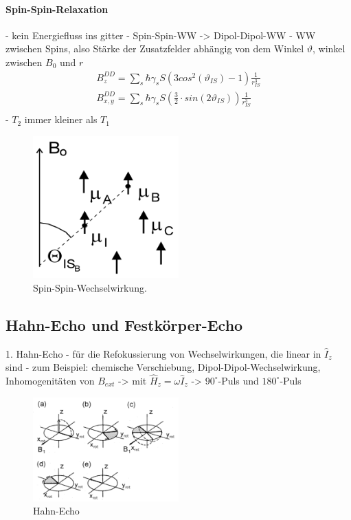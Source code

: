 \paragraph{Spin-Spin-Relaxation}
- kein Energiefluss ins gitter
- Spin-Spin-WW -> Dipol-Dipol-WW
- WW zwischen Spins, also St\"{a}rke der Zusatzfelder abh\"{a}ngig von dem Winkel $\vartheta$, winkel zwischen $B_0$ und $r$
\begin{align}
	B_z^{DD} = \sum_s \hbar \gamma_s S \left( 3 cos^2 \left(\vartheta_{IS}\right) - 1 \right) \frac{1}{r_{IS}^3} \\
	B_{x,y}^{DD} = \sum_s \hbar \gamma_s S \left( \frac{3}{2} \cdot sin\left(2 \vartheta_{IS}\right) \right) \frac{1}{r_{IS}^3} \\
\end{align}
- $T_2$ immer kleiner als $T_1$
\begin{figure}[hbtp]
	\centering
	\includegraphics[width=0.5\textwidth]{Plots/spin_spin.png}
	\caption{Spin-Spin-Wechselwirkung.}
	\label{SpinSpin}
\end{figure}


\subsection{Hahn-Echo und Festk\"{o}rper-Echo}
1. Hahn-Echo
- f\"{u}r die Refokussierung von Wechselwirkungen, die linear in $\widehat{I}_z$ sind
- zum Beispiel: chemische Verschiebung, Dipol-Dipol-Wechselwirkung, Inhomogenit\"{a}ten von $B_{ext}$
-> mit $\widehat{H}_z = \omega \widehat{I}_z$
-> $90^{\circ}$-Puls und $180^{\circ}$-Puls
\begin{figure}[hbtp]
	\centering
	\includegraphics[width=0.5\textwidth]{Plots/hahnEcho.png}
	\caption{Hahn-Echo}
	\label{hahn}
\end{figure}


